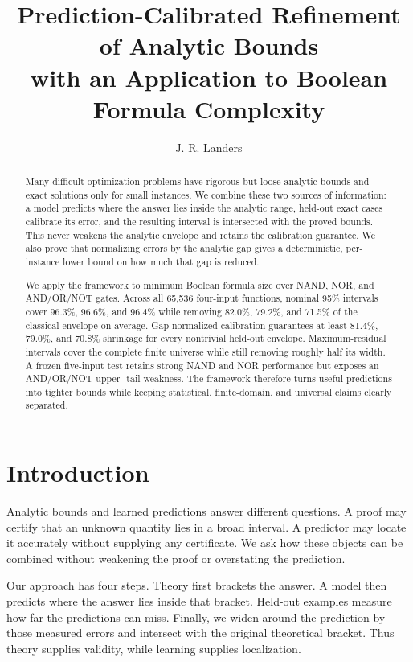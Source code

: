 \documentclass[10pt]{article}
\title{\vspace{-1.8em}\textbf{Prediction-Calibrated Refinement of Analytic Bounds}\\[-1pt]
\textbf{with an Application to Boolean Formula Complexity}}
\author{J. R. Landers}
\date{\vspace{-1.5em}}
\begin{document}
\maketitle
\vspace{-1.7em}

\begin{abstract}
Many difficult optimization problems have rigorous but loose analytic bounds
and exact solutions only for small instances.  We combine these two sources
of information: a model predicts where the answer lies inside the analytic
range, held-out exact cases calibrate its error, and the resulting interval is
intersected with the proved bounds.  This never weakens the analytic envelope
and retains the calibration guarantee.  We also prove that normalizing errors
by the analytic gap gives a deterministic, per-instance lower bound on how
much that gap is reduced.

We apply the framework to minimum Boolean formula size over NAND, NOR, and
AND/OR/NOT gates.  Across all 65,536 four-input functions, nominal 95\%
intervals cover 96.3\%, 96.6\%, and 96.4\% while removing 82.0\%, 79.2\%, and
71.5\% of the classical envelope on average.  Gap-normalized calibration
guarantees at least 81.4\%, 79.0\%, and 70.8\% shrinkage for every nontrivial
held-out envelope.  Maximum-residual intervals cover the complete finite
universe while still removing roughly half its width.  A frozen five-input
test retains strong NAND and NOR performance but exposes an AND/OR/NOT upper-
tail weakness.  The framework therefore turns useful predictions into tighter
bounds while keeping statistical, finite-domain, and universal claims clearly
separated.
\end{abstract}

\section{Introduction}

Analytic bounds and learned predictions answer different questions.  A proof
may certify that an unknown quantity lies in a broad interval.  A predictor
may locate it accurately without supplying any certificate.  We ask how these
objects can be combined without weakening the proof or overstating the
prediction.

Our approach has four steps.  Theory first brackets the answer.  A model then
predicts where the answer lies inside that bracket.  Held-out examples measure
how far the predictions can miss.  Finally, we widen around the prediction by
those measured errors and intersect with the original theoretical bracket.
Thus theory supplies validity, while learning supplies localization.
\end{document}
